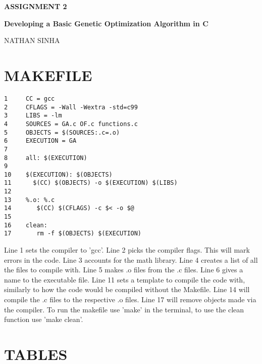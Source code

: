 \documentclass[12pt]{article}
\begin{document}
	
	\justifying
	
	\begin{center}
		\textbf{{\large ASSIGNMENT 2}}
		
		\textbf{Developing a Basic Genetic Optimization Algorithm in C} 
		
		NATHAN SINHA
	\end{center}	
	
	\section{MAKEFILE}
    \begin{lstlisting}
1     CC = gcc
2     CFLAGS = -Wall -Wextra -std=c99
3     LIBS = -lm
4     SOURCES = GA.c OF.c functions.c
5     OBJECTS = $(SOURCES:.c=.o)
6     EXECUTION = GA
7
8     all: $(EXECUTION)
9 
10    $(EXECUTION): $(OBJECTS)
11      $(CC) $(OBJECTS) -o $(EXECUTION) $(LIBS)
12
13    %.o: %.c
14	     $(CC) $(CFLAGS) -c $< -o $@
15
16    clean:
17	     rm -f $(OBJECTS) $(EXECUTION)
	\end{lstlisting}
 Line 1 sets the compiler to 'gcc'.\newline
 Line 2 picks the compiler flags. This will mark errors in the code.\newline
 Line 3 accounts for the math library.\newline
 Line 4 creates a list of all the files to compile with.\newline
 Line 5 makes .o files from the .c files.\newline
 Line 6 gives a name to the executable file.\newline
 Line 11 sets a template to compile the code with, similarly to how the code would be compiled without the Makefile.\newline
 Line 14 will compile the .c files to the respective .o files.\newline
 Line 17 will remove objects made via the compiler.\newline\newline
 To run the makefile use 'make' in the terminal, to use the clean function use 'make clean'.
 

    \newpage
	\section{TABLES}
    
\end{document}
